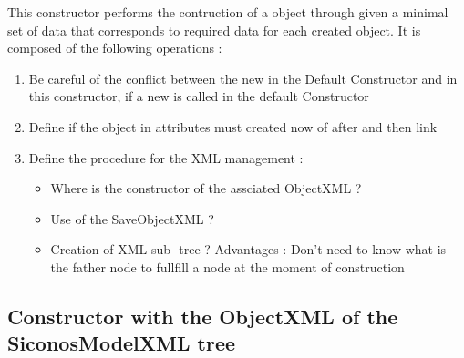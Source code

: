 This constructor performs  the contruction of a object through given a minimal set of data that corresponds to required data for each created object.  It is composed of the following operations :






 \begin{ndr}
   \begin{enumerate}
   \item Be careful of the conflict between the new in the Default Constructor and in this constructor, if a new is called in the default Constructor
   \item Define if the object in attributes must created now of after and then link
   \item Define the procedure for the XML management :
     \begin{itemize}
     \item  Where  is the constructor of the assciated ObjectXML ? 
     \item  Use of the SaveObjectXML ?
     \item  Creation of XML sub -tree ? Advantages : Don't need to know what is the father node to fullfill a node at the moment of construction
     \end{itemize}
   \end{enumerate}
 \end{ndr}


\subsection{Constructor with the ObjectXML of the SiconosModelXML tree}

